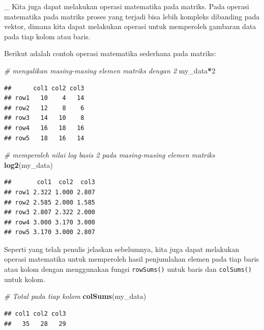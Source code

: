 \documentclass[]{book}
\newenvironment{Shaded}{\begin{snugshade}}{\end{snugshade}}
\newcommand{\CommentTok}[1]{\textcolor[rgb]{0.56,0.35,0.01}{\textit{#1}}}
\newcommand{\DecValTok}[1]{\textcolor[rgb]{0.00,0.00,0.81}{#1}}
\newcommand{\KeywordTok}[1]{\textcolor[rgb]{0.13,0.29,0.53}{\textbf{#1}}}
\newcommand{\NormalTok}[1]{#1}
\newcommand{\OperatorTok}[1]{\textcolor[rgb]{0.81,0.36,0.00}{\textbf{#1}}}
\theoremstyle{definition}
\theoremstyle{definition}
\theoremstyle{definition}
\theoremstyle{remark}
\begin{document}
\_
Kita juga dapat melakukan operasi matematika pada matriks. Pada operasi matematika pada matriks proses yang terjadi bisa lebih kompleks dibanding pada vektor, dimana kita dapat melakukan operasi untuk memperoleh gambaran data pada tiap kolom atau baris.

Berikut adalah contoh operasi matematika sederhana pada matriks:

\begin{Shaded}
\begin{Highlighting}[]
\CommentTok{# mengalikan masing-masing elemen matriks dengan 2}
\NormalTok{my_data}\OperatorTok{*}\DecValTok{2}
\end{Highlighting}
\end{Shaded}

\begin{verbatim}
##      col1 col2 col3
## row1   10    4   14
## row2   12    8    6
## row3   14   10    8
## row4   16   18   16
## row5   18   16   14
\end{verbatim}

\begin{Shaded}
\begin{Highlighting}[]
\CommentTok{# memperoleh nilai log basis 2 pada masing-masing elemen matriks}
\KeywordTok{log2}\NormalTok{(my_data)}
\end{Highlighting}
\end{Shaded}

\begin{verbatim}
##       col1  col2  col3
## row1 2.322 1.000 2.807
## row2 2.585 2.000 1.585
## row3 2.807 2.322 2.000
## row4 3.000 3.170 3.000
## row5 3.170 3.000 2.807
\end{verbatim}

Seperti yang telah penulis jelaskan sebelumnya, kita juga dapat melakukan operasi matematika untuk memperoleh hasil penjumlahan elemen pada tiap baris atau kolom dengan menggunakan fungsi \texttt{rowSums()} untuk baris dan \texttt{colSums()} untuk kolom.

\begin{Shaded}
\begin{Highlighting}[]
\CommentTok{# Total pada tiap kolom}
\KeywordTok{colSums}\NormalTok{(my_data)}
\end{Highlighting}
\end{Shaded}

\begin{verbatim}
## col1 col2 col3 
##   35   28   29
\end{verbatim}
\end{document}
